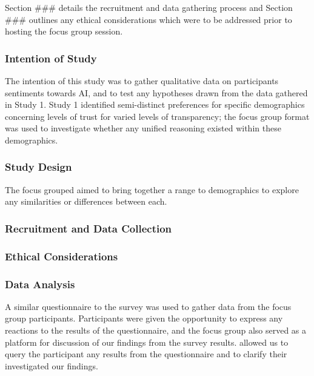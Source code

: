 \documentclass[manuscript,screen,review]{acmart}
\begin{document}
Section ### details the recruitment and data gathering process and Section ### outlines any ethical considerations which were to be addressed prior to hosting the focus group session.

\subsubsection{Intention of Study}
\label{study2_intentions}
The intention of this study was to gather qualitative data on participants sentiments towards AI, and to test any hypotheses drawn from the data gathered in Study 1. Study 1 identified semi-distinct preferences for specific demographics concerning levels of trust for varied levels of transparency; the focus group format was used to investigate whether any unified reasoning existed within these demographics.\\

\subsubsection{Study Design}
\label{study2_design}
The focus grouped aimed to bring together a range to demographics to explore any similarities or differences between each. 

\subsubsection{Recruitment and Data Collection}
\label{study2_recruitment_datacollection}

\subsubsection{Ethical Considerations}
\label{study2_ethical_considerations}

\subsubsection{Data Analysis}
\label{study2_data_analysis}

A similar questionnaire to the survey was used to gather data from the focus group participants. Participants were given the opportunity to express any reactions to the results of the questionnaire, and the focus group also served as a platform for discussion of our findings from the survey results. allowed us to query the participant any results from the questionnaire and to clarify their  investigated our findings.
\end{document}

